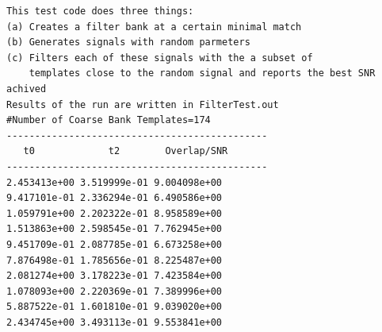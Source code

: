 \begin{verbatim}
This test code does three things:
(a) Creates a filter bank at a certain minimal match
(b) Generates signals with random parmeters
(c) Filters each of these signals with the a subset of 
    templates close to the random signal and reports the best SNR achived
Results of the run are written in FilterTest.out
#Number of Coarse Bank Templates=174
----------------------------------------------
   t0             t2        Overlap/SNR
----------------------------------------------
2.453413e+00 3.519999e-01 9.004098e+00 
9.417101e-01 2.336294e-01 6.490586e+00 
1.059791e+00 2.202322e-01 8.958589e+00 
1.513863e+00 2.598545e-01 7.762945e+00 
9.451709e-01 2.087785e-01 6.673258e+00 
7.876498e-01 1.785656e-01 8.225487e+00 
2.081274e+00 3.178223e-01 7.423584e+00 
1.078093e+00 2.220369e-01 7.389996e+00 
5.887522e-01 1.601810e-01 9.039020e+00 
2.434745e+00 3.493113e-01 9.553841e+00 
\end{verbatim}

\newpage

